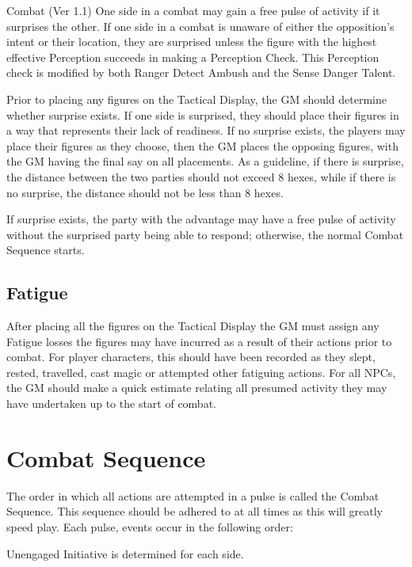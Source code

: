 \begin{Chapter}{Combat (Ver 1.1)}
One side in a combat may gain a free pulse of activity if it surprises
the other.  If one side in a combat is unaware of either the
opposition’s intent or their location, they are surprised unless the
figure with the highest effective Perception succeeds in making a
Perception Check. This Perception check is modified by both Ranger
Detect Ambush and the Sense Danger Talent.

Prior to placing any figures on the Tactical Display, the GM should
determine whether surprise exists.  If one side is surprised, they
should place their figures in a way that represents their lack of
readiness.  If no surprise exists, the players may place their figures
as they choose, then the GM places the opposing figures, with the GM
having the final say on all placements.  As a guideline, if there is
surprise, the distance between the two parties should not exceed 8
hexes, while if there is no surprise, the distance should not be less
than 8 hexes.

If surprise exists, the party with the advantage may have a free pulse
of activity without the surprised party being able to respond;
otherwise, the normal Combat Sequence starts.

\subsection{Fatigue}

After placing all the figures on the Tactical Display the GM must
assign any Fatigue losses the figures may have incurred as a result of
their actions prior to combat.  For player characters, this should
have been recorded as they slept, rested, travelled, cast magic or
attempted other fatiguing actions. For all NPCs, the GM should make a
quick estimate relating all presumed activity they may have undertaken
up to the start of combat.

\section{Combat Sequence}
\label{combat:sequence}

The order in which all actions are attempted in a pulse is called the
Combat Sequence.  This sequence should be adhered to at all times as
this will greatly speed play. Each pulse, events occur in the
following order:

\begin{Enumerate}
\item Unengaged Initiative is determined for each side.


\end{Enumerate}
\end{Chapter}
